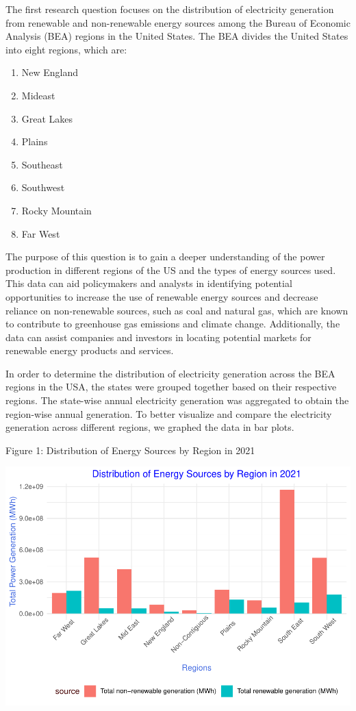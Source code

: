 \documentclass[
]{article}
\providecommand{\tightlist}{%
  \setlength{\itemsep}{0pt}\setlength{\parskip}{0pt}}
\begin{document}
The first research question focuses on the distribution of electricity
generation from renewable and non-renewable energy sources among the
Bureau of Economic Analysis (BEA) regions in the United States. The BEA
divides the United States into eight regions, which are:

\begin{enumerate}
\def\labelenumi{\arabic{enumi}.}
\tightlist
\item
  New England
\item
  Mideast
\item
  Great Lakes
\item
  Plains
\item
  Southeast
\item
  Southwest
\item
  Rocky Mountain
\item
  Far West
\end{enumerate}

The purpose of this question is to gain a deeper understanding of the
power production in different regions of the US and the types of energy
sources used. This data can aid policymakers and analysts in identifying
potential opportunities to increase the use of renewable energy sources
and decrease reliance on non-renewable sources, such as coal and natural
gas, which are known to contribute to greenhouse gas emissions and
climate change. Additionally, the data can assist companies and
investors in locating potential markets for renewable energy products
and services.

In order to determine the distribution of electricity generation across
the BEA regions in the USA, the states were grouped together based on
their respective regions. The state-wise annual electricity generation
was aggregated to obtain the region-wise annual generation. To better
visualize and compare the electricity generation across different
regions, we graphed the data in bar plots.

Figure 1: Distribution of Energy Sources by Region in 2021

\begin{center}\includegraphics{EDA_Project_Mutha_Kry_Ghosh_VS_files/figure-latex/Q1plot-1} \end{center}
\end{document}
